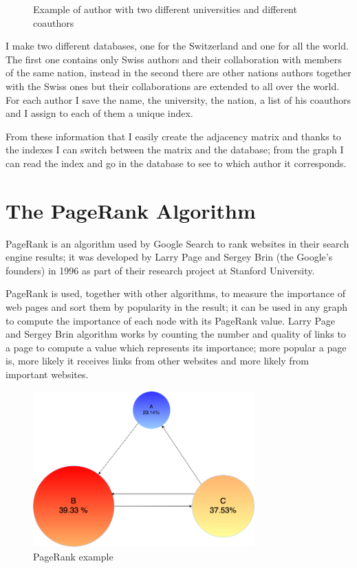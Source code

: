 \documentclass[]{usiinfbachelorproject}
\begin{document}
\begin{figure}
\begin{center}
\begin{tikzpicture}[x=0.75pt,y=0.75pt,yscale=-0.7,xscale=0.7]
\end{tikzpicture}
\caption{Example of author with two different universities and different coauthors} \label{fig:twoUni}
\end{center}
\end{figure}

I make two different databases, one for the Switzerland and one for all the world. The first one contains only Swiss authors and their collaboration with members of the same nation, instead in the second there are other nations authors together with the Swiss ones but their collaborations are extended to all over the world. For each author I save the name, the university, the nation, a list of his coauthors and I assign to each of them a unique index. 

From these information that I easily create the adjacency matrix and thanks to the indexes I can switch between the matrix and the database; from the graph I can read the index and go in the database to see to which author it corresponds.





\section{The PageRank Algorithm} \label{sec:pagerank} 
PageRank is an algorithm used by Google Search to rank websites in their search engine results; it was developed by  Larry Page and  Sergey Brin (the Google's founders) in 1996 as part of their research project at Stanford University.

PageRank is used, together with other algorithms, to measure the importance of web pages and sort them by popularity in the result; it can be used in any graph to compute the importance of each node with its PageRank value. Larry Page and  Sergey Brin algorithm works by counting the number and quality of links to a page to compute a value which represents its importance; more popular a page is, more likely it receives links from other websites and more likely from important websites.

\begin{figure}[ht]
	\centering
	\includegraphics[height=6cm]{img/page_rank_example.png}
	\caption{PageRank example}
	\label{fig:prexample}
\end{figure}
\end{document}
